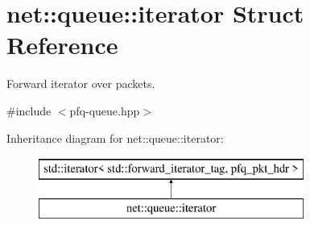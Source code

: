 \hypertarget{structnet_1_1queue_1_1iterator}{\section{net\-:\-:queue\-:\-:iterator Struct Reference}
\label{structnet_1_1queue_1_1iterator}
}


Forward iterator over packets.  




{\ttfamily \#include $<$pfq-\/queue.\-hpp$>$}

Inheritance diagram for net\-:\-:queue\-:\-:iterator\-:\begin{figure}[H]
\begin{center}
\leavevmode
\includegraphics[height=2.000000cm]{structnet_1_1queue_1_1iterator}
\end{center}
\end{figure}
